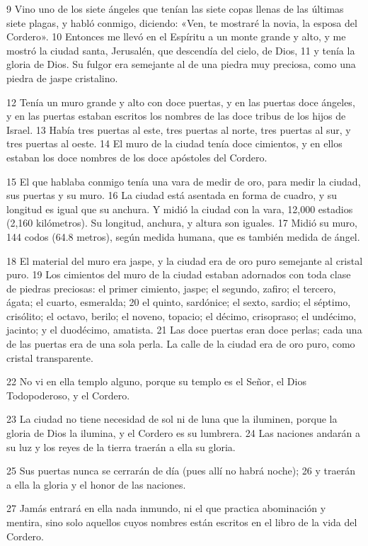 \documentclass[12pt,twocolumn,twoside]{book}
\begin{document}
9 Vino uno de los siete ángeles que tenían las siete copas llenas de las últimas siete plagas, y habló conmigo, diciendo: «Ven, te mostraré la novia, la esposa del Cordero». 10 Entonces me llevó en el Espíritu a un monte grande y alto, y me mostró la ciudad santa, Jerusalén, que descendía del cielo, de Dios, 11 y tenía la gloria de Dios. Su fulgor era semejante al de una piedra muy preciosa, como una piedra de jaspe cristalino.

12 Tenía un muro grande y alto con doce puertas, y en las puertas doce ángeles, y en las puertas estaban escritos los nombres de las doce tribus de los hijos de Israel. 13 Había tres puertas al este, tres puertas al norte, tres puertas al sur, y tres puertas al oeste. 14 El muro de la ciudad tenía doce cimientos, y en ellos estaban los doce nombres de los doce apóstoles del Cordero.

15 El que hablaba conmigo tenía una vara de medir de oro, para medir la ciudad, sus puertas y su muro. 16 La ciudad está asentada en forma de cuadro, y su longitud es igual que su anchura. Y midió la ciudad con la vara, 12,000 estadios (2,160 kilómetros). Su longitud, anchura, y altura son iguales. 17 Midió su muro, 144 codos (64.8 metros), según medida humana, que es también medida de ángel.

18 El material del muro era jaspe, y la ciudad era de oro puro semejante al cristal puro. 19 Los cimientos del muro de la ciudad estaban adornados con toda clase de piedras preciosas: el primer cimiento, jaspe; el segundo, zafiro; el tercero, ágata; el cuarto, esmeralda; 20 el quinto, sardónice; el sexto, sardio; el séptimo, crisólito; el octavo, berilo; el noveno, topacio; el décimo, crisopraso; el undécimo, jacinto; y el duodécimo, amatista. 21 Las doce puertas eran doce perlas; cada una de las puertas era de una sola perla. La calle de la ciudad era de oro puro, como cristal transparente.

22 No vi en ella templo alguno, porque su templo es el Señor, el Dios Todopoderoso, y el Cordero.

23 La ciudad no tiene necesidad de sol ni de luna que la iluminen, porque la gloria de Dios la ilumina, y el Cordero es su lumbrera. 24 Las naciones andarán a su luz y los reyes de la tierra traerán a ella su gloria.

25 Sus puertas nunca se cerrarán de día (pues allí no habrá noche); 26 y traerán a ella la gloria y el honor de las naciones.

27 Jamás entrará en ella nada inmundo, ni el que practica abominación y mentira, sino solo aquellos cuyos nombres están escritos en el libro de la vida del Cordero.
\end{document}
